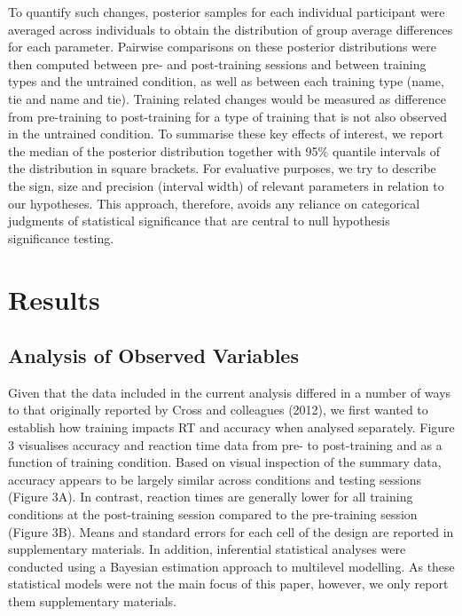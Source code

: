 \documentclass[
  english,
  man, donotrepeattitle,floatsintext]{apa6}
\begin{document}
To quantify such changes, posterior samples for each individual participant were averaged across individuals to obtain the distribution of group average differences for each parameter. Pairwise comparisons on these posterior distributions were then computed between pre- and post-training sessions and between training types and the untrained condition, as well as between each training type (name, tie and name and tie). Training related changes would be measured as difference from pre-training to post-training for a type of training that is not also observed in the untrained condition. To summarise these key effects of interest, we report the median of the posterior distribution together with 95\% quantile intervals of the distribution in square brackets. For evaluative purposes, we try to describe the sign, size and precision (interval width) of relevant parameters in relation to our hypotheses. This approach, therefore, avoids any reliance on categorical judgments of statistical significance that are central to null hypothesis significance testing.

\section{Results}\label{results}

\subsection{Analysis of Observed Variables}\label{analysis-of-observed-variables}

Given that the data included in the current analysis differed in a number of ways to that originally reported by Cross and colleagues (2012), we first wanted to establish how training impacts RT and accuracy when analysed separately. Figure 3 visualises accuracy and reaction time data from pre- to post-training and as a function of training condition. Based on visual inspection of the summary data, accuracy appears to be largely similar across conditions and testing sessions (Figure 3A). In contrast, reaction times are generally lower for all training conditions at the post-training session compared to the pre-training session (Figure 3B). Means and standard errors for each cell of the design are reported in supplementary materials. In addition, inferential statistical analyses were conducted using a Bayesian estimation approach to multilevel modelling. As these statistical models were not the main focus of this paper, however, we only report them supplementary materials.
\end{document}
